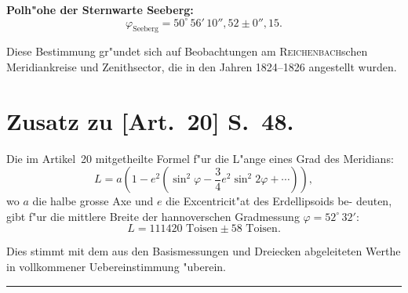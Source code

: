 \documentclass[12pt,a4paper]{article}
\theoremstyle{plain}
\theoremstyle{definition}
\theoremstyle{remark}
\begin{document}
\vspace{0.3cm}
\noindent
\textbf{Polh"ohe der Sternwarte Seeberg:}
\[
\varphi_{\text{Seeberg}} = 50^\circ\,56'\,10''{,}52 \pm 0''{,}15.
\]

\vspace{0.3cm}
\noindent
Diese Bestimmung gr"undet sich auf Beobachtungen am \textsc{Reichenbach}schen
Meridiankreise und Zenithsector, die in den Jahren 1824--1826 angestellt
wurden.

\vspace{0.5cm}
\section*{Zusatz zu [Art.~20] S.~48.}

Die im Artikel~20 mitgetheilte Formel f"ur die L"ange eines Grad des
Meridians:
\[
L = a\left(1 - e^2\left(\sin^2\varphi - \frac{3}{4}e^2\sin^2 2\varphi + \cdots\right)\right),
\]
wo $a$ die halbe grosse Axe und $e$ die Excentricit"at des Erdellipsoids be-
deuten, gibt f"ur die mittlere Breite der hannoverschen Gradmessung
$\varphi = 52^\circ\,32'$:
\[
L = 111420\text{~Toisen} \pm 58\text{~Toisen}.
\]

Dies stimmt mit dem aus den Basismessungen und Dreiecken abgeleiteten
Werthe in vollkommener Uebereinstimmung "uberein.

\vspace{1cm}
\begin{flushright}
\rule{3cm}{0.4pt}
\end{flushright}
\end{document}
